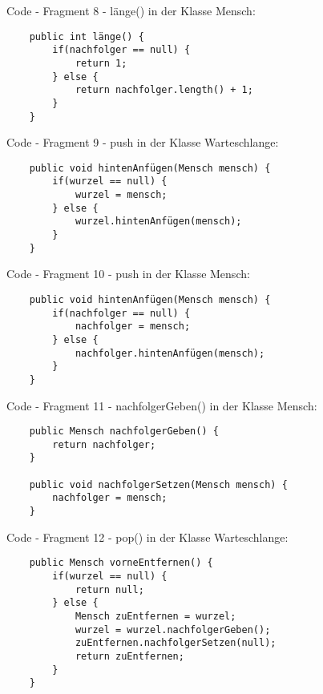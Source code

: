 \documentclass{article}
\begin{document}
Code - Fragment 8 - länge() in der Klasse Mensch:
\begin{verbatim}
    public int länge() {
        if(nachfolger == null) {
            return 1;
        } else {
            return nachfolger.length() + 1;
        }
    }
\end{verbatim}
Code - Fragment 9 - push in der Klasse Warteschlange:
\begin{verbatim}
    public void hintenAnfügen(Mensch mensch) {
        if(wurzel == null) {
            wurzel = mensch;
        } else {
            wurzel.hintenAnfügen(mensch);
        }
    }
\end{verbatim}
Code - Fragment 10 - push in der Klasse Mensch:
\begin{verbatim}
    public void hintenAnfügen(Mensch mensch) {
        if(nachfolger == null) {
            nachfolger = mensch;
        } else {
            nachfolger.hintenAnfügen(mensch);
        }
    }
\end{verbatim}
Code - Fragment 11 - nachfolgerGeben() in der Klasse Mensch:
\begin{verbatim}
    public Mensch nachfolgerGeben() {
        return nachfolger;
    }

    public void nachfolgerSetzen(Mensch mensch) {
        nachfolger = mensch;
    }
\end{verbatim}
Code - Fragment 12 - pop() in der Klasse Warteschlange:
\begin{verbatim}
    public Mensch vorneEntfernen() {
        if(wurzel == null) {
            return null;
        } else {
            Mensch zuEntfernen = wurzel;
            wurzel = wurzel.nachfolgerGeben();
            zuEntfernen.nachfolgerSetzen(null);
            return zuEntfernen;
        }
    }
\end{verbatim}
\end{document}
